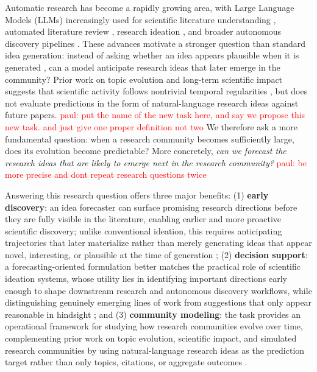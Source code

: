\documentclass{article} %
\newcommand{\paul}[1]{\textcolor{red}{paul: #1}}
\begin{document}
Automatic research has become a rapidly growing area, with Large Language Models (LLMs) increasingly used for scientific literature understanding \citep{li2024scilitllm}, automated literature review \citep{tang2025literaturereview}, research ideation \citep{baek-etal-2025-researchagent,si2025novel}, and broader autonomous discovery pipelines \citep{lu2024aiscientist,zheng2025automation}. These advances motivate a stronger question than standard idea generation: instead of asking whether an idea appears plausible when it is generated \citep{si2025novel,baek-etal-2025-researchagent}, can a model anticipate research ideas that later emerge in the community? Prior work on topic evolution and long-term scientific impact suggests that scientific activity follows nontrivial temporal regularities \citep{blei2006dynamic,wang2013impact}, but does not evaluate predictions in the form of natural-language research ideas against future papers. \paul{put the name of the new task here, and say we propose this new task. and just give one proper definition not two} We therefore ask a more fundamental question: when a research community becomes sufficiently large, does its evolution become predictable? More concretely, \textit{can we forecast the research ideas that are likely to emerge next in the research community?} \paul{be more precise and dont repeat research questions twice}

Answering this research question offers three major benefits: (1) \textbf{early discovery}: an idea forecaster can surface promising research directions before they are fully visible in the literature, enabling earlier and more proactive scientific discovery; unlike conventional ideation, this requires anticipating trajectories that later materialize rather than merely generating ideas that appear novel, interesting, or plausible at the time of generation \citep{si2025novel,baek-etal-2025-researchagent,guo2024ideabench,liu2025hypobench}; (2) \textbf{decision support}: a forecasting-oriented formulation better matches the practical role of scientific ideation systems, whose utility lies in identifying important directions early enough to shape downstream research and autonomous discovery workflows, while distinguishing genuinely emerging lines of work from suggestions that only appear reasonable in hindsight \citep{lu2024aiscientist,zheng2025automation,blei2006dynamic,wang2013impact}; and (3) \textbf{community modeling}: the task provides an operational framework for studying how research communities evolve over time, complementing prior work on topic evolution, scientific impact, and simulated research communities by using natural-language research ideas as the prediction target rather than only topics, citations, or aggregate outcomes \citep{blei2006dynamic,wang2013impact,yu2024researchtown}.
\end{document}
